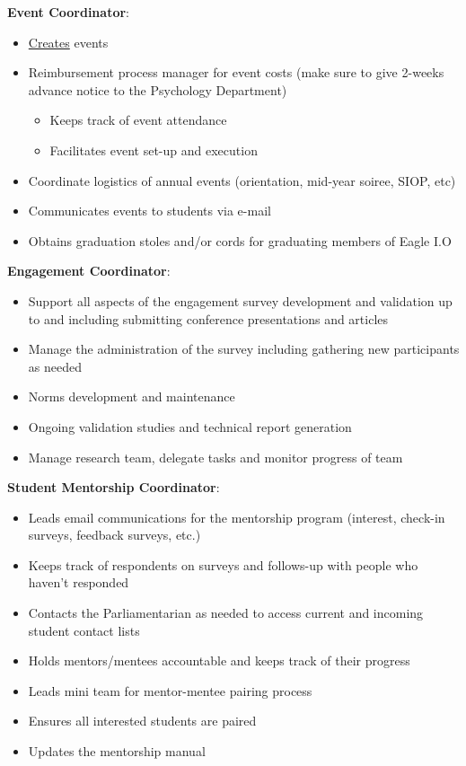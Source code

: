 \documentclass[
]{book}
\providecommand{\tightlist}{%
  \setlength{\itemsep}{0pt}\setlength{\parskip}{0pt}}
\begin{document}
\textbf{Event Coordinator}:

\begin{itemize}
\tightlist
\item
  \href{https://docs.google.com/document/d/1IjvTktndY3jRej4su-R3zDifvfWRX7zHzC9pE9od_3M/edit?usp=sharing}{Creates} events
\item
  Reimbursement process manager for event costs (make sure to give 2-weeks advance notice to the Psychology Department)

  \begin{itemize}
  \tightlist
  \item
    Keeps track of event attendance
  \item
    Facilitates event set-up and execution
  \end{itemize}
\item
  Coordinate logistics of annual events (orientation, mid-year soiree, SIOP, etc)
\item
  Communicates events to students via e-mail
\item
  Obtains graduation stoles and/or cords for graduating members of Eagle I.O
\end{itemize}

\textbf{Engagement Coordinator}:

\begin{itemize}
\tightlist
\item
  Support all aspects of the engagement survey development and validation up to and including submitting conference presentations and articles
\item
  Manage the administration of the survey including gathering new participants as needed
\item
  Norms development and maintenance
\item
  Ongoing validation studies and technical report generation\\
\item
  Manage research team, delegate tasks and monitor progress of team
\end{itemize}

\textbf{Student Mentorship Coordinator}:

\begin{itemize}
\tightlist
\item
  Leads email communications for the mentorship program (interest, check-in surveys, feedback surveys, etc.)\\
\item
  Keeps track of respondents on surveys and follows-up with people who haven't responded
\item
  Contacts the Parliamentarian as needed to access current and incoming student contact lists\\
\item
  Holds mentors/mentees accountable and keeps track of their progress\\
\item
  Leads mini team for mentor-mentee pairing process
\item
  Ensures all interested students are paired\\
\item
  Updates the mentorship manual
\end{itemize}
\end{document}
